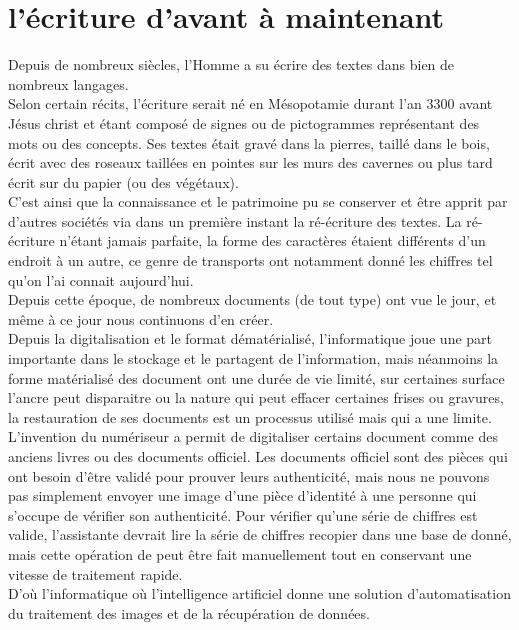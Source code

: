 
\section{l'écriture d'avant à maintenant}
Depuis de nombreux siècles, l'Homme a su écrire des textes dans bien de nombreux langages.\\
Selon certain récits, l'écriture serait né en Mésopotamie durant l'an 3300 avant Jésus christ et étant composé de signes ou de pictogrammes représentant des mots ou des concepts. Ses textes était gravé dans la pierres, taillé dans le bois, écrit avec des roseaux taillées en pointes sur les murs des cavernes ou plus tard écrit sur du papier (ou des végétaux).\\
C'est ainsi que la connaissance et le patrimoine pu se conserver et être apprit par d'autres sociétés via dans un première instant la ré-écriture des textes. La ré-écriture n'étant jamais parfaite, la forme des caractères étaient différents d'un endroit à un autre, ce genre de transports ont notamment donné les chiffres tel qu'on l'ai connait aujourd'hui.\\
Depuis cette époque, de nombreux documents (de tout type) ont vue le jour, et même à ce jour nous continuons d'en créer.\\
Depuis la digitalisation et le format dématérialisé, l'informatique joue une part importante dans le stockage et le partagent de l'information, mais néanmoins la forme matérialisé des document ont une durée de vie limité, sur certaines surface l'ancre peut disparaitre ou la nature qui peut effacer certaines frises ou gravures, la restauration de ses documents est un processus utilisé mais qui a une limite.\\
L'invention du numériseur a permit de digitaliser certains document comme des anciens livres ou des documents officiel.
Les documents officiel sont des pièces qui ont besoin d'être validé pour prouver leurs authenticité, mais nous ne pouvons pas simplement envoyer une image d'une pièce d'identité à une personne qui s'occupe de vérifier son authenticité.
Pour vérifier qu'une série de chiffres est valide, l'assistante devrait lire la série de chiffres recopier dans une base de donné, mais cette opération de peut être fait manuellement tout en conservant une vitesse de traitement rapide.\\
D'où l'informatique où l'intelligence artificiel donne une solution d'automatisation du traitement des images et de la récupération de données.

\pagebreak